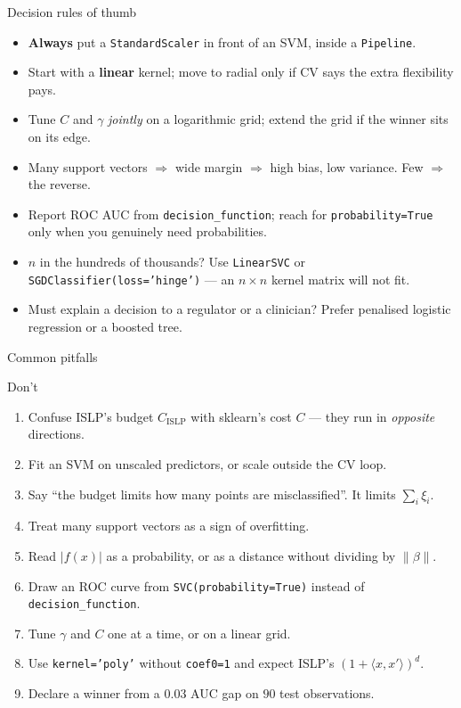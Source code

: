 \documentclass[aspectratio=169,11pt]{beamer}
\begin{document}
\begin{frame}{Decision rules of thumb}
  \footnotesize
  \begin{itemize}
    \item \textbf{Always} put a \texttt{StandardScaler} in front of an SVM,
          inside a \texttt{Pipeline}.
    \item Start with a \textbf{linear} kernel; move to radial only if CV says
          the extra flexibility pays.
    \item Tune $C$ and $\gamma$ \emph{jointly} on a logarithmic grid; extend
          the grid if the winner sits on its edge.
    \item Many support vectors $\Rightarrow$ wide margin $\Rightarrow$ high
          bias, low variance. Few $\Rightarrow$ the reverse.
    \item Report ROC AUC from \texttt{decision\_function}; reach for
          \texttt{probability=True} only when you genuinely need probabilities.
    \item $n$ in the hundreds of thousands? Use \texttt{LinearSVC} or
          \texttt{SGDClassifier(loss='hinge')} --- an $n\times n$ kernel matrix
          will not fit.
    \item Must explain a decision to a regulator or a clinician? Prefer
          penalised logistic regression or a boosted tree.
  \end{itemize}
\end{frame}

\begin{frame}{Common pitfalls}
  \footnotesize
  \begin{alertblock}{Don't}
    \begin{enumerate}
      \item Confuse ISLP's budget $C_{\text{ISLP}}$ with sklearn's cost $C$ ---
            they run in \emph{opposite} directions.
      \item Fit an SVM on unscaled predictors, or scale outside the CV loop.
      \item Say ``the budget limits how many points are misclassified''. It
            limits $\sum_i \xi_i$.
      \item Treat many support vectors as a sign of overfitting.
      \item Read $|f(x)|$ as a probability, or as a distance without dividing
            by $\|\beta\|$.
      \item Draw an ROC curve from \texttt{SVC(probability=True)} instead of
            \texttt{decision\_function}.
      \item Tune $\gamma$ and $C$ one at a time, or on a linear grid.
      \item Use \texttt{kernel='poly'} without \texttt{coef0=1} and expect
            ISLP's $(1+\langle x,x'\rangle)^d$.
      \item Declare a winner from a $0.03$ AUC gap on $90$ test observations.
    \end{enumerate}
  \end{alertblock}
\end{frame}
\end{document}
